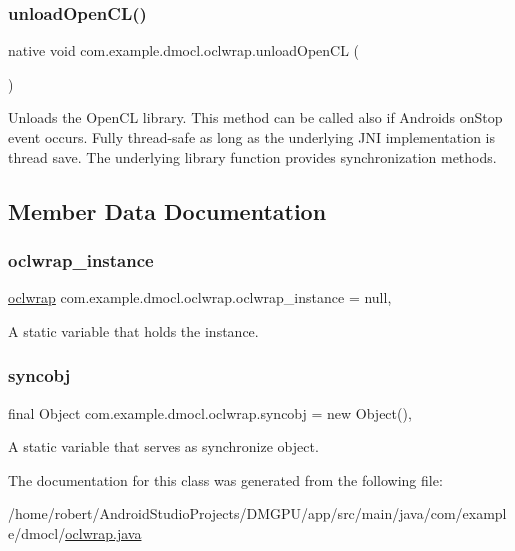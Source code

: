 \subsubsection{\texorpdfstring{unload\+Open\+C\+L()}{unloadOpenCL()}}
{\footnotesize\ttfamily native void com.\+example.\+dmocl.\+oclwrap.\+unload\+Open\+CL (\begin{DoxyParamCaption}{ }\end{DoxyParamCaption})}

Unloads the Open\+CL library. This method can be called also if Android\textquotesingle{}s \textquotesingle{}on\+Stop\textquotesingle{} event occurs.  Fully thread-\/safe as long as the underlying J\+NI implementation is thread save. The underlying library function provides synchronization methods. 

\subsection{Member Data Documentation}
\mbox{\label{classcom_1_1example_1_1dmocl_1_1oclwrap_a3d8e0d80008bcd1d88fdf3f42cd1e653}} 
\subsubsection{\texorpdfstring{oclwrap\+\_\+instance}{oclwrap\_instance}}
{\footnotesize\ttfamily \mbox{\hyperlink{classcom_1_1example_1_1dmocl_1_1oclwrap}{oclwrap}} com.\+example.\+dmocl.\+oclwrap.\+oclwrap\+\_\+instance = null\hspace{0.3cm}{\ttfamily [static]}, {\ttfamily [private]}}

A static variable that holds the instance. \mbox{\label{classcom_1_1example_1_1dmocl_1_1oclwrap_a5bdc019edb3f9334eae7a368cf0bd5c8}} 
\subsubsection{\texorpdfstring{syncobj}{syncobj}}
{\footnotesize\ttfamily final Object com.\+example.\+dmocl.\+oclwrap.\+syncobj = new Object()\hspace{0.3cm}{\ttfamily [static]}, {\ttfamily [private]}}

A static variable that serves as synchronize object. 

The documentation for this class was generated from the following file\+:\begin{DoxyCompactItemize}
\item 
/home/robert/\+Android\+Studio\+Projects/\+D\+M\+G\+P\+U/app/src/main/java/com/example/dmocl/\mbox{\hyperlink{oclwrap_8java}{oclwrap.\+java}}\end{DoxyCompactItemize}

